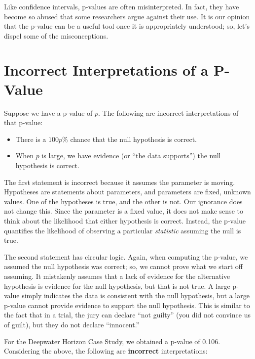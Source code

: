 \documentclass[
  letterpaper,
  DIV=11,
  numbers=noendperiod]{scrreprt}
\providecommand{\tightlist}{%
  \setlength{\itemsep}{0pt}\setlength{\parskip}{0pt}}\usepackage{longtable,booktabs,array}
\theoremstyle{definition}
\theoremstyle{definition}
\theoremstyle{plain}
\theoremstyle{remark}
\begin{document}
Like confidence intervals, p-values are often misinterpreted. In fact,
they have become so abused that some researchers argue against their
use. It is our opinion that the p-value can be a useful tool once it is
appropriately understood; so, let's dispel some of the misconceptions.

\hypertarget{incorrect-interpretations-of-a-p-value}{%
\section{Incorrect Interpretations of a
P-Value}\label{incorrect-interpretations-of-a-p-value}}

Suppose we have a p-value of \(p\). The following are incorrect
interpretations of that p-value:

\begin{itemize}
\tightlist
\item
  There is a \(100p\)\% chance that the null hypothesis is correct.
\item
  When \(p\) is large, we have evidence (or ``the data supports'') the
  null hypothesis is correct.
\end{itemize}

The first statement is incorrect because it assumes the parameter is
moving. Hypotheses are statements about parameters, and parameters are
fixed, unknown values. One of the hypotheses is true, and the other is
not. Our ignorance does not change this. Since the parameter is a fixed
value, it does not make sense to think about the likelihood that either
hypothesis is correct. Instead, the p-value quantifies the likelihood of
observing a particular \emph{statistic} assuming the null is true.

The second statement has circular logic. Again, when computing the
p-value, we assumed the null hypothesis was correct; so, we cannot prove
what we start off assuming. It mistakenly assumes that a lack of
evidence for the alternative hypothesis is evidence for the null
hypothesis, but that is not true. A large p-value simply indicates the
data is consistent with the null hypothesis, but a large p-value cannot
provide evidence to support the null hypothesis. This is similar to the
fact that in a trial, the jury can declare ``not guilty'' (you did not
convince us of guilt), but they do not declare ``innocent.''

For the Deepwater Horizon Case Study, we obtained a p-value of 0.106.
Considering the above, the following are \textbf{incorrect}
interpretations:
\end{document}
